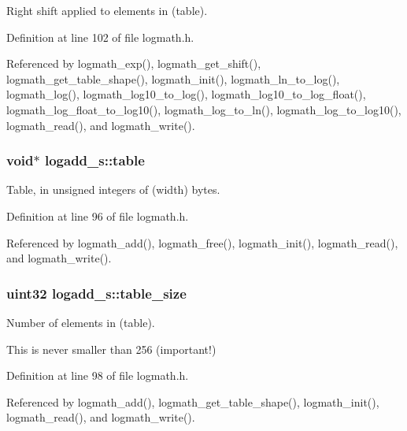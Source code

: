 Right shift applied to elements in (table). 



Definition at line 102 of file logmath.\-h.



Referenced by logmath\-\_\-exp(), logmath\-\_\-get\-\_\-shift(), logmath\-\_\-get\-\_\-table\-\_\-shape(), logmath\-\_\-init(), logmath\-\_\-ln\-\_\-to\-\_\-log(), logmath\-\_\-log(), logmath\-\_\-log10\-\_\-to\-\_\-log(), logmath\-\_\-log10\-\_\-to\-\_\-log\-\_\-float(), logmath\-\_\-log\-\_\-float\-\_\-to\-\_\-log10(), logmath\-\_\-log\-\_\-to\-\_\-ln(), logmath\-\_\-log\-\_\-to\-\_\-log10(), logmath\-\_\-read(), and logmath\-\_\-write().

\subsubsection[{table}]{\setlength{\rightskip}{0pt plus 5cm}void$\ast$ logadd\-\_\-s\-::table}\label{structlogadd__s_a27793577d513d85cd73c2daffc140695}


Table, in unsigned integers of (width) bytes. 



Definition at line 96 of file logmath.\-h.



Referenced by logmath\-\_\-add(), logmath\-\_\-free(), logmath\-\_\-init(), logmath\-\_\-read(), and logmath\-\_\-write().

\subsubsection[{table\-\_\-size}]{\setlength{\rightskip}{0pt plus 5cm}uint32 logadd\-\_\-s\-::table\-\_\-size}\label{structlogadd__s_a484c53a05b46d863d0456af679cee5d8}


Number of elements in (table). 

This is never smaller than 256 (important!) 

Definition at line 98 of file logmath.\-h.



Referenced by logmath\-\_\-add(), logmath\-\_\-get\-\_\-table\-\_\-shape(), logmath\-\_\-init(), logmath\-\_\-read(), and logmath\-\_\-write().

